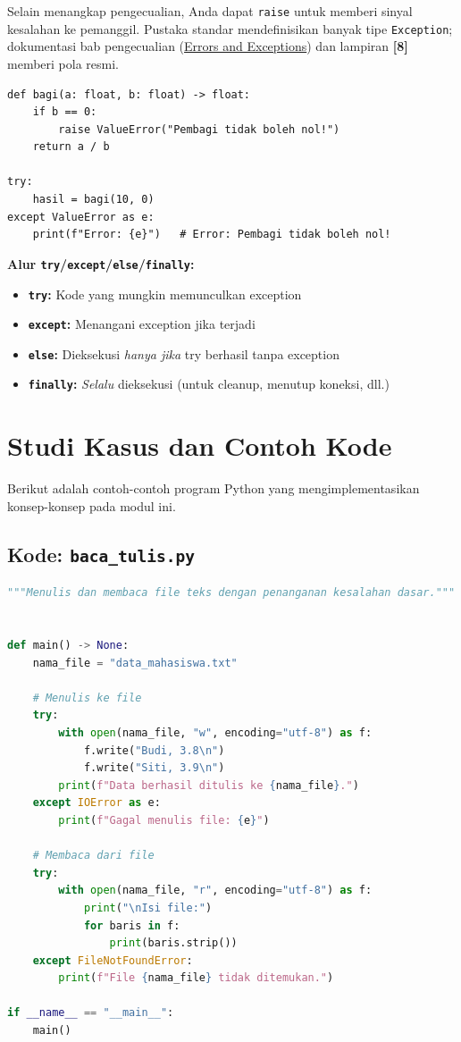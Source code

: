 \documentclass[../main.tex]{subfiles}
\begin{document}
\noindent Selain menangkap pengecualian, Anda dapat \texttt{raise} untuk memberi sinyal kesalahan ke pemanggil. Pustaka standar mendefinisikan banyak tipe \texttt{Exception}; dokumentasi bab pengecualian (\href{https://docs.python.org/3/tutorial/errors.html}{Errors and Exceptions}) dan lampiran \textbf{[8]} memberi pola resmi.

\begin{lstlisting}[caption=Raise exception dan exception kustom]
def bagi(a: float, b: float) -> float:
    if b == 0:
        raise ValueError("Pembagi tidak boleh nol!")
    return a / b

try:
    hasil = bagi(10, 0)
except ValueError as e:
    print(f"Error: {e}")   # Error: Pembagi tidak boleh nol!
\end{lstlisting}

\begin{konsep}
\textbf{Alur \texttt{try}/\texttt{except}/\texttt{else}/\texttt{finally}:}
\begin{itemize}[leftmargin=*]
  \item \textbf{\texttt{try}:} Kode yang mungkin memunculkan exception
  \item \textbf{\texttt{except}:} Menangani exception jika terjadi
  \item \textbf{\texttt{else}:} Dieksekusi \textit{hanya jika} try berhasil tanpa exception
  \item \textbf{\texttt{finally}:} \textit{Selalu} dieksekusi (untuk cleanup, menutup koneksi, dll.)
\end{itemize}
\end{konsep}

\section{Studi Kasus dan Contoh Kode}

Berikut adalah contoh-contoh program Python yang mengimplementasikan konsep-konsep pada modul ini.

\subsection{Kode: \texttt{baca\_tulis.py}}
\introstudikasuskode
\begin{lstlisting}[language=Python,caption={\texttt{baca\_tulis.py}}]
"""Menulis dan membaca file teks dengan penanganan kesalahan dasar."""


def main() -> None:
    nama_file = "data_mahasiswa.txt"
    
    # Menulis ke file
    try:
        with open(nama_file, "w", encoding="utf-8") as f:
            f.write("Budi, 3.8\n")
            f.write("Siti, 3.9\n")
        print(f"Data berhasil ditulis ke {nama_file}.")
    except IOError as e:
        print(f"Gagal menulis file: {e}")

    # Membaca dari file
    try:
        with open(nama_file, "r", encoding="utf-8") as f:
            print("\nIsi file:")
            for baris in f:
                print(baris.strip())
    except FileNotFoundError:
        print(f"File {nama_file} tidak ditemukan.")

if __name__ == "__main__":
    main()
\end{lstlisting}
\end{document}
